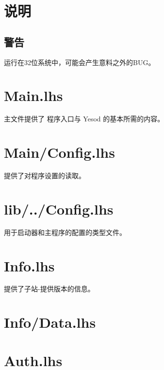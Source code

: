 










  \maketitle
  \newpage
  \tableofcontents
  \newpage

  \section{说明}
  \subsection{警告}
  运行在32位系统中，可能会产生意料之外的BUG。

  \section[程序主文件 Main.lhs文件]{Main.lhs}
  主文件提供了 程序入口与 Yesod 的基本所需的内容。
  

  \section[设置载入文件 Main/Config.lhs文件]{Main/Config.lhs}
  提供了对程序设置的读取。
  

  \section[共用的配置文件 lib/Yrarbil/Backend/Config.lhs]{lib/../Config.lhs}
  用于启动器和主程序的配置的类型文件。
  

  \section[子站-提供版本信息 Info.lhs文件]{Info.lhs}
  提供了子站-提供版本的信息。
  

  \section[辅助Info.lhs文件]{Info/Data.lhs}
  

  \section[认证]{Auth.lhs}
  

